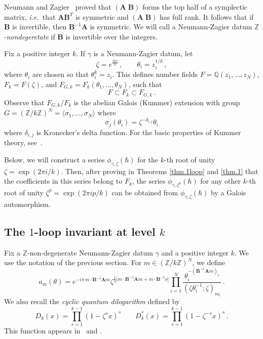\documentclass[12pt]{amsart}
\theoremstyle{definition}
\def\BZ{\mathbb Z}
\def\BQ{\mathbb Q}
\def\ga{\gamma}
\def\la{\langle}
\def\ra{\rangle}
\def\th{\theta}
\def\be{  \begin{equation} }
\def\ee{  \end{equation} }
\newcommand{\ie}{\emph{i.e.}}
\newcommand{\mb}{\mathbf}
\begin{document}
Neumann and Zagier~\cite{NZ} proved that $(\mb A\;\mb B)$ forms the top 
half of a symplectic matrix, \ie\ that $\mb A\mb B^T$ is symmetric and
$(\mb A\;\mb B)$ has full rank. It follows that if $\mb B$ is invertible, 
then $\mb B^{-1}\mb A$ is symmetric. 
We will call a Neumann-Zagier datum $\BZ$-\emph{nondegeretate} if $\mb B$ is 
invertible over the integers.

Fix a positive integer $k$. If $\ga$
is a Neumann-Zagier datum, let
%
\be 
\label{eq.zeta.theta}
\zeta = e^{\frac{2\pi i}{k}}\,,\qquad \theta_i = z_i^{1/k}\,,
\ee
%
where $\theta_i$ are chosen so that $\theta_i^k=z_i$. 
This defines number fields 
$F = \BQ(z_1,...,z_N)$, $F_k = F(\zeta)$, and $F_{G,k} 
=F_k(\theta_1,...,\theta_N)$, such that
%
\be 
F\subset F_k\subset F_{G,k}\,.
\ee
%
Observe that $F_{G,k}/F_k$ is the abelian Galois (Kummer) extension 
with group $G=(\BZ/k\BZ)^N=\la \sigma_1,\dots, \sigma_N \ra$ where 
\be
\label{eq.sigma}
\sigma_j(\th_i)=\zeta^{-\delta_{i,j}} \th_i 
\ee
where $\delta_{i,j}$ is Kronecker's delta function.
For the basic properties of Kummer theory, see~\cite[Sec.VI.8]{Lang}.

Below, we will construct a series $\phi_{\gamma,\zeta}(\hbar)$ 
for the $k$-th root of unity $\zeta = \exp(2\pi i/k)$. Then, after proving 
in Theorems \ref{thm.1loop} and  \ref{thm.1} that the coefficients in this 
series belong to $F_k$, the series $\phi_{\gamma,\zeta^p}(\hbar)$ for any other 
$k$-th root of unity $\zeta^p = \exp(2\pi ip/k)$ can be obtained from 
$\phi_{\gamma,\zeta}(\hbar)$ by a Galois automorphism.

\subsection{The $1$-loop invariant at level $k$}

Fix a $\BZ$-non-degenerate Neumann-Zagier datum $\gamma$ 
and a positive integer $k$. We use the notation of the 
previous section. For $m\in (\BZ/k\BZ)^N$, we define 
%
\be
\label{eq.amth}
a_m(\theta) = e^{-i\pi\, m\cdot\mb B^{-1}\mb A m} 
\zeta^{\frac12 \big[m\cdot \mb B^{-1}\mb A m+ m\cdot \mb B^{-1}\nu\big]}
\prod_{i=1}^N
\frac{\th_i^{-(\mb B^{-1} \mb A m)_i}}{
(\zeta \th_i^{-1};\zeta )_{m_i}}\,.
\ee
%
We also recall the {\em cyclic quantum dilogarithm} defined by
\be
D_k(x)=\prod_{s=1}^{k-1}(1-\zeta^{s}x)^s \qquad
D^*_k(x)=\prod_{s=1}^{k-1}(1-\zeta^{-s}x)^s \,.
\ee
This function appears in~\cite[Eqn.C.3]{Kashaev:star} and 
\cite[Eqn.2.30]{Kashaev:quantum.hyper}. 
\end{document}
